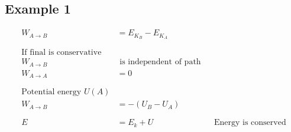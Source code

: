 \documentclass[12pt]{article}
\begin{document}
\subsection{Example 1}
\begin{align*}
	W_{A \to B} & = E_{K_B} - E_{K_A}                                            \\
	\phantom{=}                                                                  \\
	\text{If final is conservative}                                              \\
	W_{A \to B} & \text{ is independent of path}                                 \\
	W_{A \to A} & = 0                                                            \\
	\phantom{=}                                                                  \\
	\text{Potential energy } U(A)                                                \\
	W_{A \to B} & = -(U_B - U_A)                                                 \\
	\phantom{=}                                                                  \\
	E           & = E_k + U                      &  & \text{Energy is conserved}
\end{align*}
\end{document}
